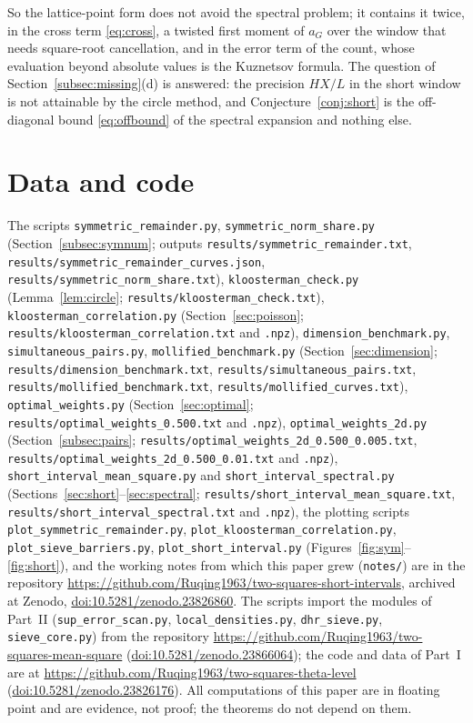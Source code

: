 \documentclass[11pt]{amsart}
\theoremstyle{remark}
\begin{document}
So the lattice-point form does not avoid the spectral problem; it contains it twice, in the cross term \eqref{eq:cross}, a twisted first moment of $a_G$ over the window that needs square-root cancellation, and in the error term of the count, whose evaluation beyond absolute values is the Kuznetsov formula. The question of Section~\ref{subsec:missing}(d) is answered: the precision $HX/L$ in the short window is not attainable by the circle method, and Conjecture~\ref{conj:short} is the off-diagonal bound \eqref{eq:offbound} of the spectral expansion and nothing else.

\section*{Data and code}
{\raggedright
The scripts \texttt{symmetric\_remainder.py}, \texttt{symmetric\_norm\_share.py} (Section~\ref{subsec:symnum}; outputs \texttt{results/symmetric\_remainder.txt}, \texttt{results/symmetric\_remainder\_curves.json}, \texttt{results/symmetric\_norm\_share.txt}), \texttt{kloosterman\_check.py} (Lemma~\ref{lem:circle}; \texttt{results/kloosterman\_check.txt}), \texttt{kloosterman\_correlation.py} (Section~\ref{sec:poisson}; \texttt{results/kloosterman\_correlation.txt} and \texttt{.npz}), \texttt{dimension\_benchmark.py}, \texttt{simultaneous\_pairs.py}, \texttt{mollified\_benchmark.py} (Section~\ref{sec:dimension}; \texttt{results/dimension\_benchmark.txt}, \texttt{results/simultaneous\_pairs.txt}, \texttt{results/mollified\_benchmark.txt}, \texttt{results/mollified\_curves.txt}), \texttt{optimal\_weights.py} (Section~\ref{sec:optimal}; \texttt{results/optimal\_weights\_0.500.txt} and \texttt{.npz}), \texttt{optimal\_weights\_2d.py} (Section~\ref{subsec:pairs}; \texttt{results/optimal\_weights\_2d\_0.500\_0.005.txt}, \texttt{results/optimal\_weights\_2d\_0.500\_0.01.txt} and \texttt{.npz}), \texttt{short\_interval\_mean\_square.py} and \texttt{short\_interval\_spectral.py} (Sections~\ref{sec:short}--\ref{sec:spectral}; \texttt{results/short\_interval\_mean\_square.txt}, \texttt{results/short\_interval\_spectral.txt} and \texttt{.npz}), the plotting scripts \texttt{plot\_symmetric\_remainder.py}, \texttt{plot\_kloosterman\_correlation.py}, \texttt{plot\_sieve\_barriers.py}, \texttt{plot\_short\_interval.py} (Figures~\ref{fig:sym}--\ref{fig:short}), and the working notes from which this paper grew (\texttt{notes/}) are in the repository \url{https://github.com/Ruqing1963/two-squares-short-intervals}, archived at Zenodo, \href{https://doi.org/10.5281/zenodo.23826860}{doi:10.5281/zenodo.23826860}. The scripts import the modules of Part~II (\texttt{sup\_error\_scan.py}, \texttt{local\_densities.py}, \texttt{dhr\_sieve.py}, \texttt{sieve\_core.py}) from the repository \url{https://github.com/Ruqing1963/two-squares-mean-square} (\href{https://doi.org/10.5281/zenodo.23866064}{doi:10.5281/zenodo.23866064}); the code and data of Part~I are at \url{https://github.com/Ruqing1963/two-squares-theta-level} (\href{https://doi.org/10.5281/zenodo.23826176}{doi:10.5281/zenodo.23826176}). All computations of this paper are in floating point and are evidence, not proof; the theorems do not depend on them.
\par}
\end{document}
